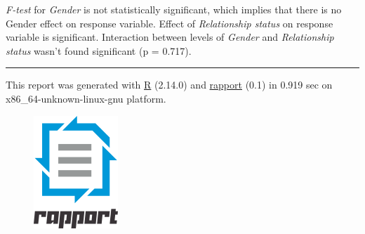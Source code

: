 \documentclass[]{article}
\makeatletter
\def\maxwidth{\ifdim\Gin@nat@width>\linewidth\linewidth
\else\Gin@nat@width\fi}
\let\Oldincludegraphics\includegraphics
\renewcommand{\includegraphics}[1]{\Oldincludegraphics[width=\maxwidth]{#1}}
\makeatother
\begin{document}
\emph{F-test} for \emph{Gender} is not statistically significant, which
implies that there is no Gender effect on response variable. Effect of
\emph{Relationship status} on response variable is significant.
Interaction between levels of \emph{Gender} and \emph{Relationship
status} wasn't found significant (p = 0.717).

\begin{center}\rule{3in}{0.4pt}\end{center}

This report was generated with \href{http://www.r-project.org/}{R}
(2.14.0) and \href{http://al3xa.github.com/rapport/}{rapport} (0.1) in
0.919 sec on x86\_64-unknown-linux-gnu platform.

\begin{figure}[htbp]
\centering
\includegraphics{images/logo.png}
\caption{}
\end{figure}
\end{document}
